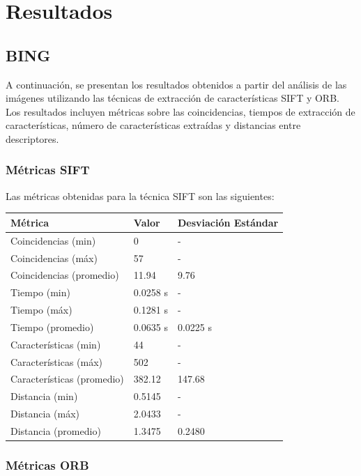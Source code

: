 \documentclass[unnumsec,webpdf,modern,large]{mam-authoring-template}
\theoremstyle{thmstyleone}%
\theoremstyle{thmstyletwo}%
\theoremstyle{thmstylethree}%
\begin{document}
\section{Resultados}
\subsection{BING}
A continuación, se presentan los resultados obtenidos a partir del análisis de las imágenes utilizando las técnicas de extracción de características SIFT y ORB. Los resultados incluyen métricas sobre las coincidencias, tiempos de extracción de características, número de características extraídas y distancias entre descriptores.

\subsubsection{Métricas SIFT}

Las métricas obtenidas para la técnica SIFT son las siguientes:

\begin{center}
\begin{tabular}{ | m{7em} | m{1.5cm} | m{1.5cm} | } 
  \hline
  \textbf{Métrica} & \textbf{Valor} & \textbf{Desviación Estándar} \\ 
  \hline
  Coincidencias (min) & 0 & - \\ 
  \hline
  Coincidencias (máx) & 57 & - \\ 
  \hline
  Coincidencias (promedio) & 11.94 & 9.76 \\ 
  \hline
  Tiempo (min) & 0.0258 s & - \\ 
  \hline
  Tiempo (máx) & 0.1281 s & - \\ 
  \hline
  Tiempo (promedio) & 0.0635 s & 0.0225 s \\ 
  \hline
  Características (min) & 44 & - \\ 
  \hline
  Características (máx) & 502 & - \\ 
  \hline
  Características (promedio) & 382.12 & 147.68 \\ 
  \hline
  Distancia (min) & 0.5145 & - \\ 
  \hline
  Distancia (máx) & 2.0433 & - \\ 
  \hline
  Distancia (promedio) & 1.3475 & 0.2480 \\ 
  \hline
\end{tabular}
\end{center}

\subsubsection{Métricas ORB}
\end{document}
